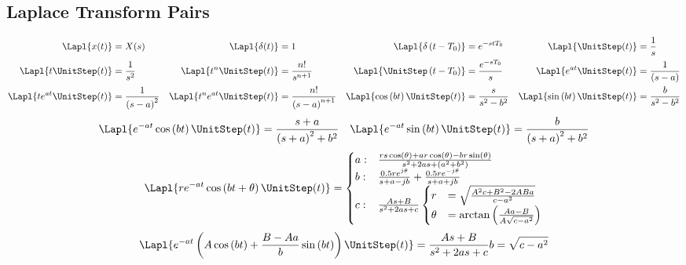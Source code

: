 		\vspace{-5mm}
		
	\subsection*{Laplace Transform Pairs} \label{subsec:Laplace Transform Pairs}
		\begin{align*}
			\Lapl \lbrace x (t) \rbrace &= X(s) & \Lapl \lbrace \delta (t) \rbrace &= 1 & \Lapl \lbrace \delta \left( t-T_{0} \right) \rbrace &= e^{-stT_{0}} & \Lapl \lbrace \UnitStep (t) \rbrace &= \frac{1}{s} \\
			\Lapl \lbrace t \UnitStep (t) \rbrace &= \frac{1}{s^{2}} & \Lapl \lbrace t^{n}\UnitStep (t) \rbrace &= \frac{n!}{s^{n+1}} & \Lapl \lbrace \UnitStep \left( t-T_{0} \right) \rbrace &= \frac{e^{-sT_{0}}}{s} & \Lapl \lbrace e^{at} \UnitStep (t) \rbrace &= \frac{1}{\left( s-a \right)} \\
			\Lapl \lbrace t e^{at} \UnitStep (t) \rbrace &= \frac{1}{\left( s-a \right)^{2}} & \Lapl \lbrace t^{n} e^{at} \UnitStep (t) \rbrace &= \frac{n!}{\left( s-a \right)^{n+1}} & \Lapl \lbrace \cos \left( bt \right) \UnitStep (t) \rbrace &= \frac{s}{s^{2}-b^{2}} & \Lapl \lbrace \sin \left( bt \right) \UnitStep (t) \rbrace &= \frac{b}{s^{2}-b^{2}} \\
		\end{align*}
		\begin{align*}
			\Lapl \lbrace e^{-at} \cos \left( bt \right) \UnitStep (t) \rbrace &= \frac{s+a}{\left( s+a \right)^{2} + b^{2}} & \Lapl \lbrace e^{-at} \sin \left( bt \right) \UnitStep (t) \rbrace &= \frac{b}{\left( s+a \right)^{2} + b^{2}} \\
		\end{align*}
		\begin{equation*}
			\Lapl \lbrace r e^{-at} \cos \left( bt + \theta \right) \UnitStep (t) \rbrace =
				\begin{cases}
					a: & \frac{rs \cos \left( \theta \right) + ar \cos \left( \theta \right) - br \sin \left( \theta \right)}{s^{2} + 2as + \left( a^{2} + b^{2} \right)} \\
					b: & \frac{0.5 re^{j \theta}}{s+a-jb} + \frac{0.5 re^{-j \theta}}{s+a+jb} \\
					c: & \frac{As+B}{s^{2} + 2as + c}
						\begin{cases}
							r &=\sqrt{\frac{A^{2}c + B^{2} -2ABa}{c-a^{2}}} \\
							\theta &= \arctan \left( \frac{Aa-B}{A \sqrt{c-a^{2}}} \right)
						\end{cases} \\
				\end{cases}
		\end{equation*}
		\begin{equation*}
			\Lapl \lbrace e^{-at} \left( A \cos \left( bt \right) + \frac{B-Aa}{b} \sin \left( bt \right) \right) \UnitStep (t) \rbrace = \frac{As+B}{s^{2} + 2as + c} \\
			b = \sqrt{c-a^{2}}
		\end{equation*}